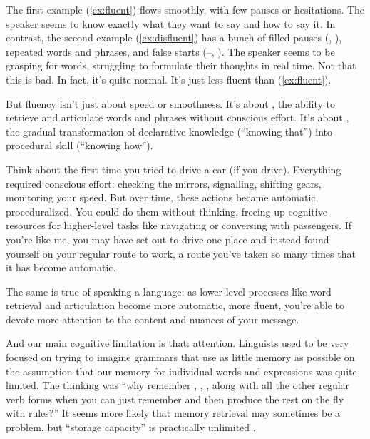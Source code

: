 \ea
    \label{ex:fluent}
    \label{ex:disfluent}
    \z
\z
The first example (\ref{ex:fluent}) flows smoothly, with few pauses or hesitations. The speaker seems to know exactly what they want to say and how to say it. In contrast, the second example (\ref{ex:disfluent}) has a bunch of filled pauses (, ), repeated words and phrases, and false starts (--, ). The speaker seems to be grasping for words, struggling to formulate their thoughts in real time. Not that this is bad. In fact, it's quite normal. It's just less fluent than (\ref{ex:fluent}).

But fluency isn't just about speed or smoothness. It's about , the ability to retrieve and articulate words and phrases without conscious effort. It's about , the gradual transformation of declarative knowledge (``knowing that'') into procedural skill (``knowing how'').

Think about the first time you tried to drive a car (if you drive). Everything required conscious effort: checking the mirrors, signalling, shifting gears, monitoring your speed. But over time, these actions became automatic, proceduralized. You could do them without thinking, freeing up cognitive resources for higher-level tasks like navigating or conversing with passengers. If you're like me, you may have set out to drive one place and instead found yourself on your regular route to work, a route you've taken so many times that it has become automatic.

The same is true of speaking a language: as lower-level processes like word retrieval and articulation become more automatic, more fluent, you're able to devote more attention to the content and nuances of your message.

And our main cognitive limitation is that: attention. Linguists used to be very focused on trying to imagine grammars that use as little memory as possible on the assumption that our memory for individual words and expressions was quite limited. The thinking was \enquote{why remember , , ,  along with all the other regular verb forms when you can just remember  and then produce the rest on the fly with rules?} It seems more likely that memory retrieval may sometimes be a problem, but \enquote{storage capacity} is practically unlimited \citep{Erman2000, JackendoffAudring2018}.

